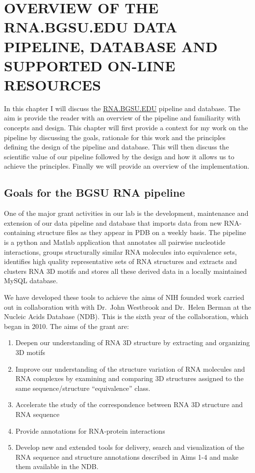 \chapter{OVERVIEW OF THE RNA.BGSU.EDU DATA PIPELINE, DATABASE AND SUPPORTED
ON-LINE RESOURCES}

In this chapter I will discuss the \href{http://rna.bgsu.edu}{RNA.BGSU.EDU}
pipeline and database. The aim is provide the reader with an overview of the
pipeline and familiarity with concepts and design. This chapter will first
provide a context for my work on the pipeline by discussing the goals, rationale
for this work and the principles defining the design of the pipeline and
database. This will then discuss the scientific value of our pipeline followed
by the design and how it allows us to achieve the principles. Finally we will
provide an overview of the implementation. 

\section{Goals for the BGSU RNA pipeline}

One of the major grant activities in our lab is the development, maintenance and
extension of our data pipeline and database that imports data from new
RNA-containing structure files as they appear in PDB on a weekly basis. The
pipeline is a python and Matlab application that annotates all pairwise
nucleotide interactions, groups structurally similar RNA molecules into
equivalence sets, identifies high quality representative sets of RNA structures
and extracts and clusters RNA 3D motifs and stores all these derived data in a
locally maintained MySQL database.

We have developed these tools to achieve the aims of NIH founded work carried
out in collaboration with with Dr.\ John Westbrook and Dr.\ Helen Berman at the
Nucleic Acids Database (NDB). This is the sixth year of the collaboration, which
began in 2010. The aims of the grant are:

\begin{enumerate}
        \item Deepen our understanding of RNA 3D structure by extracting and
                organizing 3D motifs

        \item Improve our understanding of the structure variation of RNA
                molecules and RNA complexes by examining and comparing 3D
                structures assigned to the same sequence/structure ``equivalence''
                class.

        \item Accelerate the study of the correspondence between RNA 3D
                structure and RNA sequence

        \item Provide annotations for RNA-protein interactions

        \item Develop new and extended tools for delivery, search and
                visualization of the RNA sequence and structure annotations
                described in Aims 1-4 and make them available in the NDB.
\end{enumerate}

